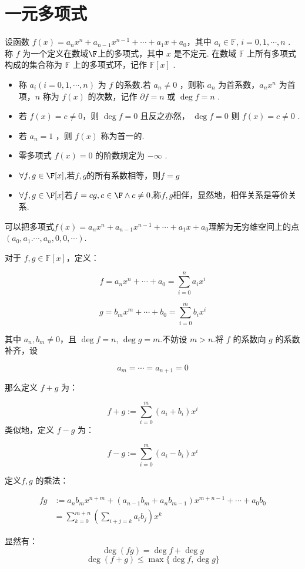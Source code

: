 \section{一元多项式}
\begin{definition}\label{p1:concept:c1-l558}
	设函数  $f(x) = a_n x^n + a_{n-1} x^{n-1} + \cdots + a_1 x + a_0 $，其中 $ a_i \in \mathbb{F}$, $i=0,1,\cdots,n$ .
	称  $f $ 为一个定义在数域$\F$上的多项式，其中  $x $ 是不定元.
	在数域  $\mathbb{F}$  上所有多项式构成的集合称为  $\mathbb{F} $ 上的多项式环，记作 $ \mathbb{F}[x]$ .
	\begin{itemize}
		\item 称  $a_i (i=0,1,\cdots,n)$  为  $f$  的系数.若  $a_n \neq 0$ ，则称 $a_n$  为首系数，$ a_n x^n $ 为首项，$n $ 称为  $f(x)$ 的次数，记作 $ \partial f = n $ 或  $\deg f = n$ .
		\item 若  $f(x) = c \neq 0 $，则  $\deg f = 0$  且反之亦然， $\deg f = 0$  则 $ f(x) = c \neq 0$ .
		\item 若 $ a_n = 1$ ，则  $f(x)$  称为首一的.
		\item 零多项式 $f(x) = 0$  的阶数规定为 $-\infty$ .
		\item $\forall f,g\in \F[x]$,若$f,g$的所有系数相等，则$f=g$
		\item $\forall f,g\in \F[x]$若$f=cg,c\in\F\wedge c\neq0$,称$ f,g$相伴，显然地，相伴关系是等价关系.
	\end{itemize}
	
\end{definition}
可以把多项式$f(x)= a_n x^n + a_{n-1} x^{n-1} + \cdots + a_1 x + a_0$理解为无穷维空间上的点$(a_0,a_1.\cdots,a_n,0,0,\cdots)$.
\begin{definition}\label{p1:concept:c1-l573}
	对于 \( f, g \in \mathbb{F}[x] \)，定义：
	
	\[
	f = a_n x^n + \cdots + a_0 = \sum_{i=0}^{n} a_i x^i
	\]
	
	\[
	g = b_m x^m + \cdots + b_0 = \sum_{i=0}^{m} b_i x^i
	\]
	
	其中 \( a_n, b_m \neq 0 \)，且 \( \deg f = n \), \( \deg g = m \).不妨设 \( m > n \).将 \( f \) 的系数向 \( g \) 的系数补齐，设
	
	\[
	a_m = \cdots = a_{n+1} = 0 
	\]
	
	那么定义 \( f + g \) 为：
	
	\[
	f + g := \sum_{i=0}^{m} (a_i + b_i) x^i
	\]
	类似地，定义 \( f - g \) 为：
	
	\[
	f - g := \sum_{i=0}^{m} (a_i - b_i) x^i
	\]
	
	定义\( f ,g \) 的乘法：
	
	\[\begin{aligned}
		fg &:= a_n b_m x^{n+m} + (a_{n-1} b_m + a_n b_{m-1}) x^{m+n-1} + \cdots + a_0 b_0\\
		&= \sum_{k=0}^{m+n} \left( \sum_{i+j=k} a_i b_j \right) x^k
	\end{aligned}\]
	
\end{definition}
显然有：
	\[\deg(fg) = \deg f + \deg g\]
	\[\deg(f + g) \leqslant \max \{ \deg f, \deg g \}\]
	
